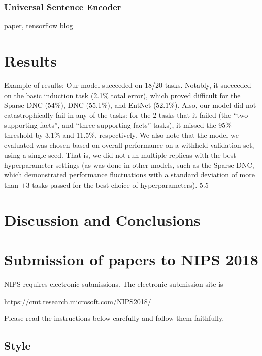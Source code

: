 \documentclass{article}
\begin{document}
\subsubsection{Universal Sentence Encoder}
paper, tensorflow blog

\section{Results}

Example of results:
Our model succeeded on 18/20 tasks. Notably, it succeeded on the basic induction task (2.1\% total error), which proved difficult for the Sparse DNC (54\%), DNC (55.1\%), and EntNet (52.1\%). Also, our model did not catastrophically fail in any of the tasks: for the 2 tasks that it failed (the “two supporting facts”, and “three supporting facts” tasks), it missed the 95\% threshold by 3.1\% and 11.5\%, respectively. We also note that the model we evaluated was chosen based on overall performance on a withheld validation set, using a single seed. That is, we did not run multiple replicas with the best hyperparameter settings (as was done in other models, such as the Sparse DNC, which demonstrated performance fluctuations with a standard deviation of more than $\pm 3$ tasks passed for the best choice of hyperparameters).
5.5


\section{Discussion and Conclusions}









\newpage

\section{Submission of papers to NIPS 2018}

NIPS requires electronic submissions.  The electronic submission site
is
\begin{center}
  \url{https://cmt.research.microsoft.com/NIPS2018/}
\end{center}

Please read the instructions below carefully and follow them faithfully.

\subsection{Style}
\end{document}
